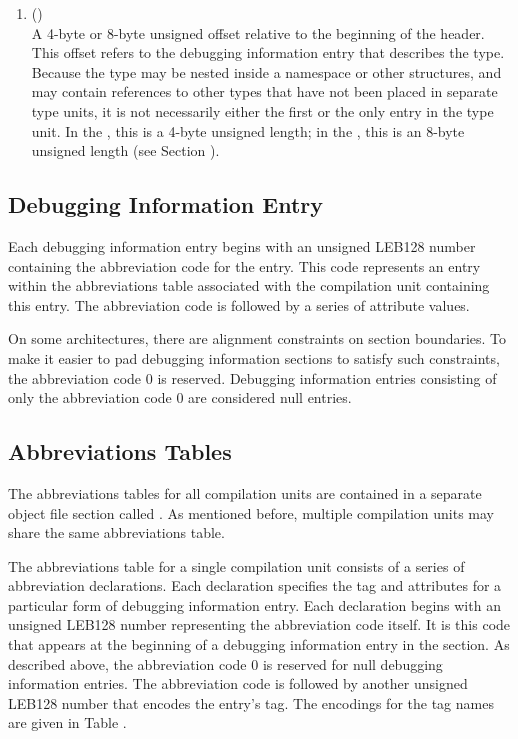 \begin{enumerate}[1. ]
\item \HFNtypeoffset{} () \\
A 4-byte or 8-byte unsigned offset 
relative to the beginning
of the  header.
This offset refers to the debugging
information entry that describes the type. Because the type
may be nested inside a namespace or other structures, and may
contain references to other types that have not been placed in
separate type units, it is not necessarily either the first or
the only entry in the type unit. In the \thirtytwobitdwarfformat,
this is a 4-byte unsigned length; in the \sixtyfourbitdwarfformat,
this is an 8-byte unsigned length
(see Section ).

\end{enumerate}

\subsection{Debugging Information Entry}
\label{datarep:debugginginformationentry}
Each debugging information entry begins with an 
unsigned LEB128
number containing the abbreviation code for the entry. This
code represents an entry within the abbreviations table
associated with the compilation unit containing this entry. The
abbreviation code is followed by a series of attribute values.

On some architectures, there are alignment constraints on
section boundaries. To make it easier to pad debugging
information sections to satisfy such constraints, the
abbreviation code 0 is reserved. Debugging information entries
consisting of only the abbreviation code 0 are considered
null entries.

\subsection{Abbreviations Tables}
\label{datarep:abbreviationstables}
The abbreviations tables for all compilation units
are contained in a separate object file section called
\dotdebugabbrev{}.
As mentioned before, multiple compilation
units may share the same abbreviations table.

The abbreviations table for a single compilation unit consists
of a series of abbreviation declarations. Each declaration
specifies the tag and attributes for a particular form of
debugging information entry. Each declaration begins with
an unsigned LEB128
number representing the abbreviation
code itself. It is this code that appears at the beginning
of a debugging information entry in the 
\dotdebuginfo{}
section. As described above, the abbreviation
code 0 is reserved for null debugging information entries. The
abbreviation code is followed by another unsigned LEB128
number that encodes the entry\textquoteright s tag. The encodings for the
tag names are given in 
Table .

